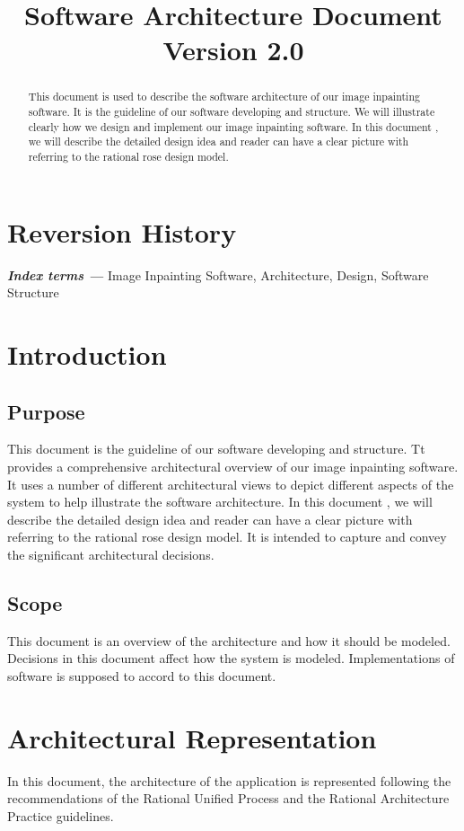 \documentclass[12pt]{article}
\title{Software Architecture Document\\Version 2.0}
\providecommand{\keywords}[1]{\textbf{\textit{Index terms ---}} #1}
\begin{document}
\maketitle

\section*{Reversion History}
\begin{abstract}
\qquad This document is used to describe the software architecture of our image inpainting software. It is the guideline of our software developing and structure. We will illustrate clearly how we design and implement our image inpainting software. In this document , we will describe the detailed design idea and reader can have a clear picture with referring to the rational rose design model.
\end{abstract}
\keywords{Image Inpainting Software, Architecture, Design, Software Structure}

\newpage
\tableofcontents
\newpage

\section{Introduction}
\subsection{Purpose}
\qquad This document is the guideline of our software developing and structure. Tt provides a comprehensive architectural overview of our image inpainting software.  It uses a number of different architectural views to depict different aspects of the system to help illustrate the software architecture. In this document , we will describe the detailed design idea and reader can have a clear picture with referring to the rational rose design model. It is intended to capture and convey the significant architectural decisions.
\subsection{Scope}
\qquad This document is an overview of the architecture and how it should be modeled. Decisions in this document affect how the system is modeled. Implementations of software is supposed to accord to this document.

\section{Architectural Representation}
\qquad In this document, the architecture of the application is represented following the recommendations of the Rational Unified Process and the Rational Architecture Practice guidelines. 
\end{document}
